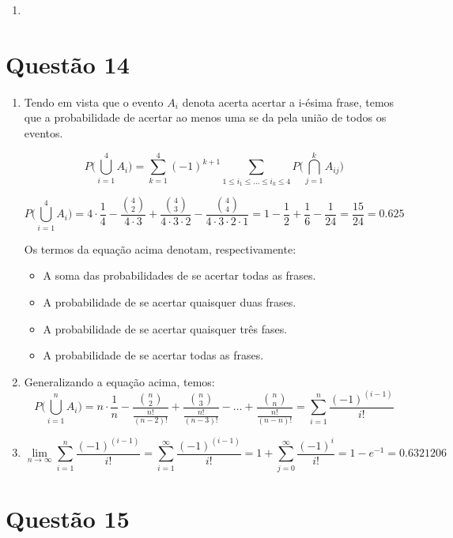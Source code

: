 \documentclass[a4paper,12pt]{report}
\begin{document}
\begin{enumerate}[label=\alph*)]
\begin{enumerate}[label=\roman*)]
\item 


\end{enumerate}
\end{enumerate}
\newpage
\section{Questão 14}
\begin{enumerate}[label=\alph*)]
	\item 

Tendo em vista que o evento $A_i$ denota acerta acertar a i-ésima frase, temos que a probabilidade de acertar ao menos uma se da pela união de todos os eventos. 

$$ P\bigg(\bigcup\limits_{i=1}^{4}A_i\bigg) =  \sum\limits_{k=1}^{4}(-1)^{k+1} \sum\limits_{1\le i_1\le \ldots \le i_k\le 4} P\bigg(\bigcap\limits_{j=1}^{k}A_{ij} \bigg)$$

$$ P\bigg(\bigcup\limits_{i=1}^{4}A_i\bigg) = 4\cdot \frac{1}{4}  - \frac{\binom{4}{2}}{4\cdot3} +\frac{\binom{4}{3}}{4\cdot3\cdot 2}-\frac{\binom{4}{4}}{4\cdot3\cdot2\cdot 1}  = 1- \frac{1}{2}  +\frac{1}{6} - \frac{1}{24} = \frac{15}{24}=0.625$$

Os termos da equação acima denotam, respectivamente:
\begin{itemize}
	\item A soma das probabilidades de se acertar todas as frases.
	\item A probabilidade de se acertar quaisquer duas frases.
	\item A probabilidade de se acertar quaisquer três fases.
	\item A probabilidade de se acertar todas as frases.
\end{itemize}
\item 
Generalizando a equação acima, temos:
$$ P\bigg(\bigcup\limits_{i=1}^{n}A_i\bigg) = n\cdot \frac{1}{n}  - \frac{\binom{n}{2}}{\frac{n!}{(n-2)!}} +\frac{\binom{n}{3}}{\frac{n!}{(n-3)!}} -\ldots+
\frac{\binom{n}{n}}{\frac{n!}{(n-n)!}} = \sum\limits_{i=1}^{n}\frac{(-1)^{(i-1)}}{i!}
 $$
 \item 
 $$\lim\limits_{n\rightarrow \infty} \sum\limits_{i=1}^{n}\frac{(-1)^{(i-1)}}{i!}= 
\sum\limits_{i=1}^{\infty}\frac{(-1)^{(i-1)}}{i!}= 1 + \sum\limits_{j=0}^{\infty}\frac{(-1)^{i}}{i!}  = 1- e^{-1} = 0.6321206
   $$
 
 


\end{enumerate}
\newpage
\section{Questão 15}
\end{document}
